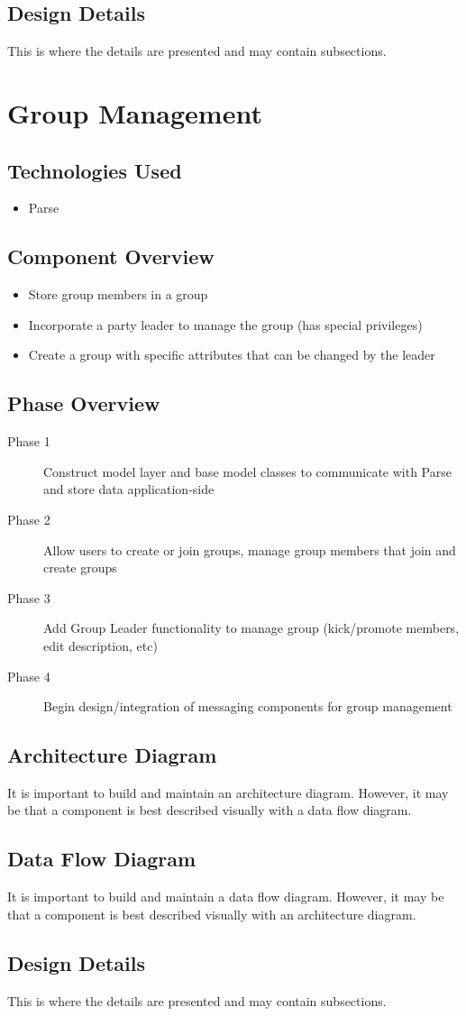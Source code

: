 \subsection{Design Details}
This is where the details are presented and may contain subsections. 

\section{Group Management }

\subsection{Technologies  Used}
\begin{itemize}
  \item Parse
\end{itemize}

\subsection{Component  Overview}
\begin{itemize}
  \item Store group members in a group
  \item Incorporate a party leader to manage the group (has special privileges)
  \item Create a group with specific attributes that can be changed by the leader
\end{itemize}

\subsection{Phase Overview}
\begin{description}
  \item [Phase 1] Construct model layer and base model classes to communicate with Parse and store data application-side
  \item [Phase 2] Allow users to create or join groups, manage group members that join and create groups
  \item [Phase 3] Add Group Leader functionality to manage group (kick/promote members, edit description, etc)
  \item [Phase 4] Begin design/integration of messaging components for group management
\end{description}
\subsection{ Architecture  Diagram}
It is important to build and maintain an architecture diagram.  However, it may 
be that a component is best described visually with a data flow diagram. 


\subsection{Data Flow Diagram}
It is important to build and maintain a data flow diagram.  However, it may be 
that a component is best described visually with an architecture diagram. 


\subsection{Design Details}
This is where the details are presented and may contain subsections. 


